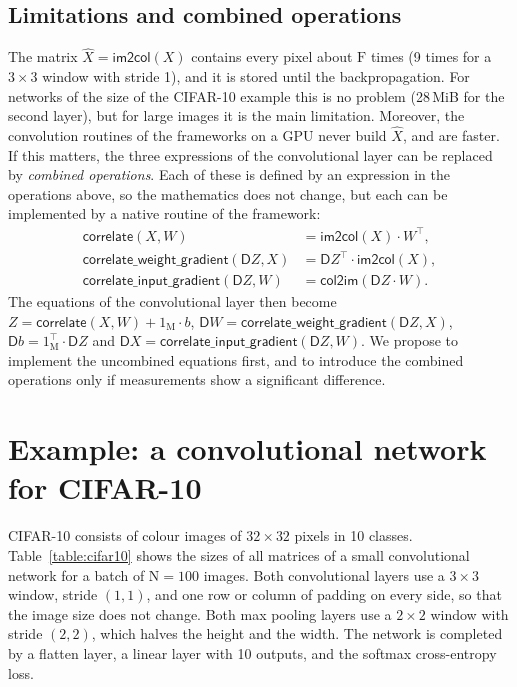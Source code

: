 \documentclass[twoside,11pt]{article}
\newcommand{\const}[1]{\ensuremath{\mathrm{#1}}} %
\newcommand{\func}[1]{\ensuremath{\textsf{#1}}}  %
\newcommand{\Gradient}{\textsf{D}}
\newcommand{\Fs}{\const{F}}          %
\newcommand{\im}{\func{im2col}}
\newcommand{\ci}{\func{col2im}}
\begin{document}
\subsection{Limitations and combined operations}
The matrix $\hat X = \im(X)$ contains every pixel about $\Fs$ times (9 times for a $3 \times 3$ window with stride 1), and it is stored until the backpropagation.
For networks of the size of the CIFAR-10 example this is no problem (28\,MiB for the second layer), but for large images it is the main limitation.
Moreover, the convolution routines of the frameworks on a GPU never build $\hat X$, and are faster.
If this matters, the three expressions of the convolutional layer can be replaced by \emph{combined operations}.
Each of these is defined by an expression in the operations above, so the mathematics does not change, but each can be implemented by a native routine of the framework:
\begin{align*}
\func{correlate}(X, W) &= \im(X) \cdot W^\top, \\
\func{correlate\_weight\_gradient}(\Gradient Z, X) &= \Gradient Z^\top \cdot \im(X), \\
\func{correlate\_input\_gradient}(\Gradient Z, W) &= \ci(\Gradient Z \cdot W).
\end{align*}
The equations of the convolutional layer then become $Z = \func{correlate}(X, W) + 1_\const{M} \cdot b$, $\Gradient W = \func{correlate\_weight\_gradient}(\Gradient Z, X)$, $\Gradient b = 1_\const{M}^\top \cdot \Gradient Z$ and $\Gradient X = \func{correlate\_input\_gradient}(\Gradient Z, W)$.
We propose to implement the uncombined equations first, and to introduce the combined operations only if measurements show a significant difference.

\section{Example: a convolutional network for CIFAR-10} \label{section:example}

CIFAR-10 consists of colour images of $32 \times 32$ pixels in 10 classes.
Table~\ref{table:cifar10} shows the sizes of all matrices of a small convolutional network for a batch of $\const{N} = 100$ images.
Both convolutional layers use a $3 \times 3$ window, stride $(1,1)$, and one row or column of padding on every side, so that the image size does not change.
Both max pooling layers use a $2 \times 2$ window with stride $(2,2)$, which halves the height and the width.
The network is completed by a flatten layer, a linear layer with 10 outputs, and the softmax cross-entropy loss.
\end{document}
